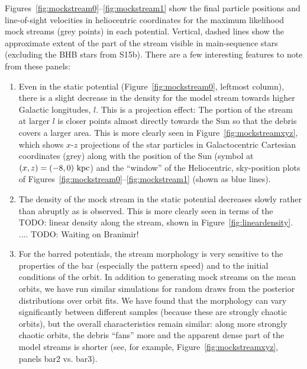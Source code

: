 \documentclass[letterpaper,12pt,preprint]{aastex}
\newcommand{\todo}[1]{{\color{red} TODO: #1}}
\begin{document}
Figures~\ref{fig:mockstream0}--\ref{fig:mockstream1} show the final particle positions and line-of-sight velocities in heliocentric coordinates for the maximum likelihood mock streams (grey points) in each potential. Vertical, dashed lines show the approximate extent of the part of the stream visible in main-sequence stars (excluding the BHB stars from S15b). There are a few interesting features to note from these panels: 
\begin{enumerate}
	\item Even in the static potential (Figure~\ref{fig:mockstream0}, leftmost column), there is a slight decrease in the density for the model stream towards higher Galactic longitudes, $l$. This is a projection effect: The portion of the stream at larger $l$ is closer points almost directly towards the Sun so that the debris covers a larger area. This is more clearly seen in Figure~\ref{fig:mockstreamxyz}, which shows $x$-$z$ projections of the star particles in Galactocentric Cartesian coordinates (grey) along with the position of the Sun (symbol at $(x,z)=(-8,0)~{\rm kpc}$) and the ``window'' of the Heliocentric, sky-position plots of Figures~\ref{fig:mockstream0}--\ref{fig:mockstream1} (shown as blue lines).
	\item The density of the mock stream in the static potential decreases slowly rather than abruptly as is observed. This is more clearly seen in terms of the \todo{linear density along the stream, shown in Figure~\ref{fig:lineardensity}}. .... \todo{Waiting on Branimir!}
	\item For the barred potentials, the stream morphology is very sensitive to the properties of the bar (especially the pattern speed) and to the initial conditions of the orbit. In addition to generating mock streams on the mean orbits, we have run similar simulations for random draws from the posterior distributions over orbit fits. We have found that the morphology can vary significantly between different samples (because these are strongly chaotic orbits), but the overall characteristics remain similar: along more strongly chaotic orbits, the debris ``fans'' more and the apparent dense part of the model streams is shorter (see, for example, Figure~\ref{fig:mockstreamxyz}, panels bar2 vs. bar3).
\end{enumerate}

\end{document}
